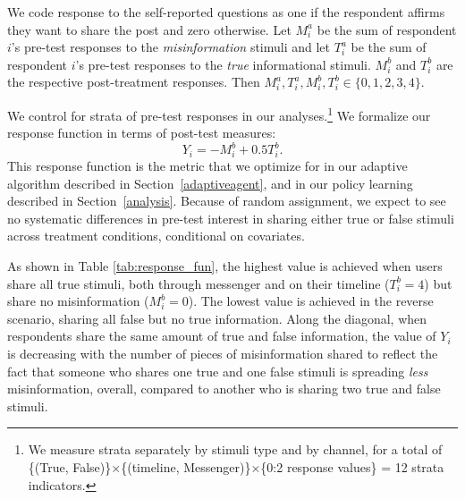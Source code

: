 \documentclass[letterpaper, 12pt, parskip=full,DIV=10]{scrartcl}
\begin{document}
We code response to the self-reported questions as one if the respondent affirms they want to share the post and zero otherwise. Let $M_i^a$ be the sum of respondent $i$'s pre-test responses to the \textit{misinformation} stimuli and let $T_i^a$ be the sum of respondent $i$'s pre-test responses to the \textit{true} informational stimuli. $M_i^b$ and $T_i^b$ are the respective post-treatment responses. Then $M_i^a, T_i^a, M_i^b, T_i^b \in \{0,1,2, 3, 4\}$. 

We control for strata of pre-test responses in our analyses.\footnote{{We measure strata separately by stimuli type and by channel, for a total of \{(True, False)\}$\times$\{(timeline, Messenger)\}$\times$\{0:2 response values\} = 12 strata indicators.}}
We formalize our response function in terms of post-test measures:
\[
Y_i = -M^b_i + 0.5 T^b_i.
\]
This response function is the metric that we optimize for in our adaptive algorithm described in Section~\ref{adaptiveagent}, and in our policy learning described in Section~\ref{analysis}. Because of random assignment, we expect to see no systematic differences in pre-test interest in sharing either true or false stimuli across treatment conditions, conditional on covariates. 


As shown in Table \ref{tab:response_fun}, {the highest value is achieved when users share all true stimuli, both through messenger and on their timeline ($T^b_i = 4$) but share no misinformation ($M^b_i = 0$). The lowest value is achieved in the reverse scenario, sharing all false but no true information. Along the diagonal, when respondents share the same amount of true and false information, the value of $Y_i$ is decreasing with the number of pieces of misinformation shared to reflect the fact that someone who shares one true and one false stimuli is spreading \textit{less} misinformation, overall, compared to another who is sharing two true and false stimuli.}  
\end{document}
